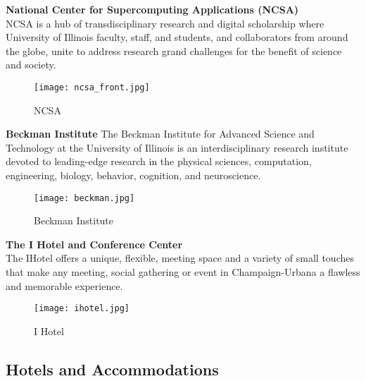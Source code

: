 \textbf{National Center for Supercomputing Applications (NCSA)}\\
NCSA is a hub of transdisciplinary research and digital scholarship where University of Illinois faculty, staff, and students, and collaborators from around the globe, unite to address research grand challenges for the benefit of science and society.\\
\begin{figure}[H]
	\centering
	\texttt{[image: ncsa\_front.jpg]}
	\caption{NCSA}
	\label{fig:ncsa}
\end{figure}

\textbf{Beckman Institute}
The Beckman Institute for Advanced Science and Technology at the University of Illinois is an interdisciplinary research institute devoted to leading-edge research in the physical sciences, computation, engineering, biology, behavior, cognition, and neuroscience.\\

\begin{figure}[H]
	\centering
	\texttt{[image: beckman.jpg]}
	\caption{Beckman Institute}
	\label{fig:beckman}
\end{figure}

\textbf{The I Hotel and Conference Center}\\
The IHotel offers a unique, flexible, meeting space and a variety of small touches that make any meeting, social gathering or event in Champaign-Urbana a flawless and memorable experience.\\

\begin{figure}[H]
    \centering
    \texttt{[image: ihotel.jpg]}
    \caption{I Hotel}
    \label{fig:beckman}
\end{figure}

\newpage
\subsection{Hotels and Accommodations}

